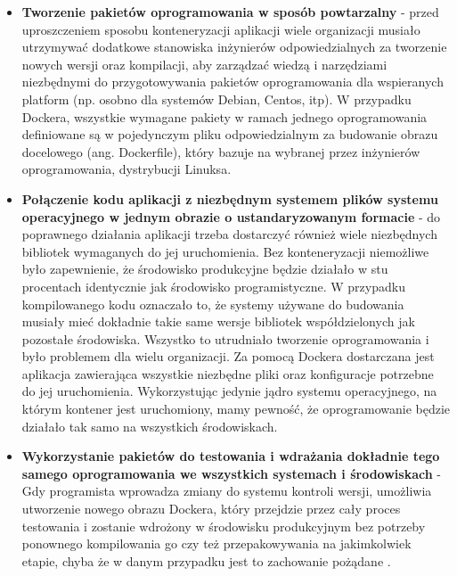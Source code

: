 \begin{itemize}
    \item \textbf{Tworzenie pakietów oprogramowania w sposób powtarzalny} - przed uproszczeniem sposobu konteneryzacji aplikacji wiele organizacji musiało utrzymywać dodatkowe stanowiska inżynierów odpowiedzialnych za tworzenie nowych wersji oraz kompilacji, aby zarządzać wiedzą i narzędziami niezbędnymi do przygotowywania pakietów oprogramowania dla wspieranych platform (np. osobno dla systemów Debian, Centos, itp). W przypadku Dockera, wszystkie wymagane pakiety w ramach jednego oprogramowania definiowane są w pojedynczym pliku odpowiedzialnym za budowanie obrazu docelowego (ang. Dockerfile), który bazuje na wybranej przez inżynierów oprogramowania, dystrybucji Linuksa.
    \item \textbf{Połączenie kodu aplikacji z niezbędnym systemem plików systemu operacyjnego w jednym obrazie o ustandaryzowanym formacie} - do poprawnego działania aplikacji trzeba dostarczyć również wiele niezbędnych bibliotek wymaganych do jej uruchomienia. Bez konteneryzacji niemożliwe było zapewnienie, że środowisko produkcyjne będzie działało w stu procentach identycznie jak środowisko programistyczne. W przypadku kompilowanego kodu oznaczało to, że systemy używane do budowania musiały mieć dokładnie takie same wersje bibliotek współdzielonych jak pozostałe środowiska. Wszystko to utrudniało tworzenie oprogramowania i było problemem dla wielu organizacji. Za pomocą Dockera dostarczana jest aplikacja zawierająca wszystkie niezbędne pliki oraz konfiguracje potrzebne do jej uruchomienia. Wykorzystując jedynie jądro systemu operacyjnego, na którym kontener jest uruchomiony, mamy pewność, że oprogramowanie będzie działało tak samo na wszystkich środowiskach.
    \item \textbf{Wykorzystanie pakietów do testowania i wdrażania dokładnie tego samego oprogramowania we wszystkich systemach i środowiskach} - Gdy programista wprowadza zmiany do systemu kontroli wersji, umożliwia utworzenie nowego obrazu Dockera, który przejdzie przez cały proces testowania i zostanie wdrożony w środowisku produkcyjnym bez potrzeby ponownego kompilowania go czy też przepakowywania na jakimkolwiek etapie, chyba że w danym przypadku jest to zachowanie pożądane \cite{virmani2015understanding}.
\end{itemize}

